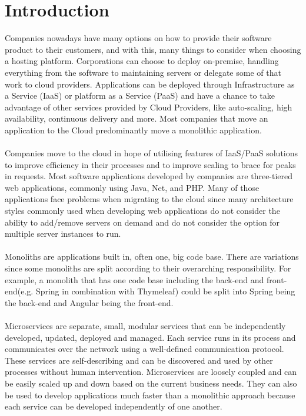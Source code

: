 \documentclass[BIF,Master,nenglish]{twbook}%
\begin{document}
\maketitle

%
%
\chapter{Introduction}
Companies nowadays have many options on how to provide their software product to their customers, and with this, many things to consider when choosing a hosting platform. Corporations can choose to deploy on-premise, handling everything from the software to maintaining servers or delegate some of that work to cloud providers. Applications can be deployed through Infrastructure as a Service (IaaS)\cite{microIaas} or platform as a Service (PaaS)\cite{redPaas} and have a chance to take advantage of other services provided by Cloud Providers, like auto-scaling, high availability, continuous delivery and more. Most companies that move an application to the Cloud predominantly move a monolithic application.
\\
\\
Companies move to the cloud in hope of utilising features of IaaS/PaaS solutions to improve efficiency in their processes and to improve scaling to brace for peaks in requests. Most software applications developed by companies are three-tiered web applications, commonly using Java, Net, and PHP. Many of those applications face problems when migrating to the cloud since many architecture styles commonly used when developing web applications do not consider the ability to add/remove servers on demand and do not consider the option for multiple server instances to run.
\\
\\
Monoliths are applications built in, often one, big code base. There are variations since some monoliths are split according to their overarching responsibility. For example, a monolith that has one code base including the back-end and front-end(e.g. Spring in combination with Thymeleaf) could be split into Spring being the back-end and Angular being the front-end.
\\
\\
Microservices are separate, small, modular services that can be independently developed, updated, deployed and managed. Each service runs in its process and communicates over the network using a well-defined communication protocol. These services are self-describing and can be discovered and used by other processes without human intervention. Microservices are loosely coupled and can be easily scaled up and down based on the current business needs. They can also be used to develop applications much faster than a monolithic approach because each service can be developed independently of one another\cite{ade2017}.
\end{document}
